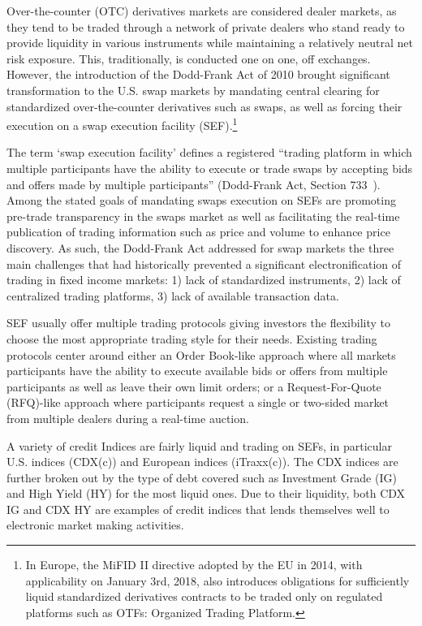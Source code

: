 Over-the-counter (OTC) derivatives markets are considered dealer markets, as they tend to be traded through a network of private dealers who stand ready to provide liquidity in various instruments while maintaining a relatively neutral net risk exposure. This, traditionally, is conducted one on one, off exchanges. However, the introduction of the Dodd-Frank Act of 2010 brought significant transformation to the U.S. swap markets by mandating central clearing for standardized over-the-counter derivatives such as swaps, as well as forcing their execution on a swap execution facility (SEF).\footnote{In Europe, the MiFID II directive adopted by the EU in 2014, with applicability on January 3rd, 2018, also introduces obligations for sufficiently liquid standardized derivatives contracts to be traded only on regulated platforms such as OTFs: Organized Trading Platform.}


The term `swap execution facility' defines a registered ``trading platform in which multiple participants have the ability to execute or trade swaps by accepting bids and offers made by multiple participants'' (Dodd-Frank Act, Section 733~\cite{DoddFrank}). Among the stated goals of mandating swaps execution on SEFs are promoting pre-trade transparency in the swaps market as well as facilitating the real-time publication of trading information such as price and volume to enhance price discovery. As such, the Dodd-Frank Act addressed for swap markets the three main challenges that had historically prevented a significant electronification of trading in fixed income markets: 1) lack of standardized instruments, 2) lack of centralized trading platforms, 3) lack of available transaction data.


SEF usually offer multiple trading protocols giving investors the flexibility to choose the most appropriate trading style for their needs. Existing trading protocols center around either an Order Book-like approach where all markets participants have the ability to execute available bids or offers from multiple participants as well as leave their own limit orders; or a Request-For-Quote (RFQ)-like approach where participants request a single or two-sided market from multiple dealers during a real-time auction.


A variety of credit Indices are fairly liquid and trading on SEFs, in particular U.S. indices (CDX(c)) and European indices (iTraxx(c)). The CDX indices are further broken out by the type of debt covered such as Investment Grade (IG) and High Yield (HY) for the most liquid ones. Due to their liquidity, both CDX IG and CDX HY are examples of credit indices that lends themselves well to electronic market making activities.


